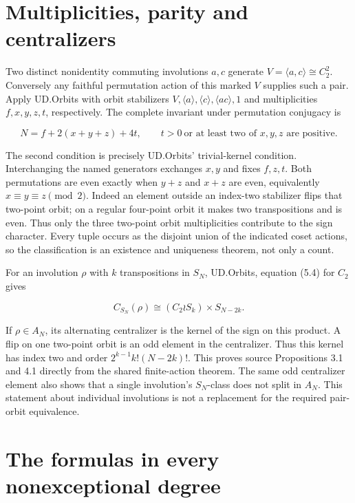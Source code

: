 \section{Multiplicities, parity and
centralizers}\label{multiplicities-parity-and-centralizers}

Two distinct nonidentity commuting involutions \(a,c\) generate
\(V=\langle a,c\rangle\cong C_2^2\). Conversely any faithful permutation
action of this marked \(V\) supplies such a pair. Apply UD.Orbits with
orbit stabilizers
\(V,\langle a\rangle,\langle c\rangle,\langle ac\rangle,1\) and
multiplicities \(f,x,y,z,t\), respectively. The complete invariant under
permutation conjugacy is

\[
 N=f+2(x+y+z)+4t,\qquad
 t>0\ \text{or at least two of }x,y,z\text{ are positive}.
 \tag{CPI1}
\]

The second condition is precisely UD.Orbits' trivial-kernel condition.
Interchanging the named generators exchanges \(x,y\) and fixes
\(f,z,t\). Both permutations are even exactly when \(y+z\) and \(x+z\)
are even, equivalently \(x\equiv y\equiv z\pmod2\). Indeed an element
outside an index-two stabilizer flips that two-point orbit; on a regular
four-point orbit it makes two transpositions and is even. Thus only the
three two-point orbit multiplicities contribute to the sign character.
Every tuple occurs as the disjoint union of the indicated coset actions,
so the classification is an existence and uniqueness theorem, not only a
count.

For an involution \(\rho\) with \(k\) transpositions in \(S_N\),
UD.Orbits, equation (5.4) for \(C_2\) gives

\[
 C_{S_N}(\rho)\cong(C_2\wr S_k)\times S_{N-2k}.
 \tag{CPI2}
\]

If \(\rho\in A_N\), its alternating centralizer is the kernel of the
sign on this product. A flip on one two-point orbit is an odd element in
the centralizer. Thus this kernel has index two and order
\(2^{k-1}k!(N-2k)!\). This proves source Propositions 3.1 and 4.1
directly from the shared finite-action theorem. The same odd centralizer
element also shows that a single involution's \(S_N\)-class does not
split in \(A_N\). This statement about individual involutions is not a
replacement for the required pair-orbit equivalence.

\section{The formulas in every nonexceptional
degree}\label{the-formulas-in-every-nonexceptional-degree}


